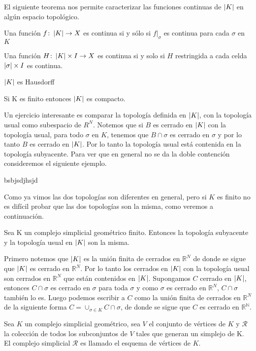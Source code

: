 El siguiente teorema nos permite caracterizar las funciones continuas de $\left| K \right|$ en algún espacio topológico.
\begin{Teo}\label{ttc}
Una función $f\colon \left| K \right|\rightarrow X$ es continua si y sólo si $f|_{\sigma}$ es continua para cada $\sigma$ en $K$
\end{Teo}
\begin{Teo}
Una función $H\colon \left| K \right|\times I \to X$ es continua si y solo si $H$ restringida a cada celda $\left| \sigma \right|\times I$ es continua.
\end{Teo}
\begin{Teo}
$\left| K \right|$ es Hausdorff
\end{Teo}
\begin{Teo}
Si K es finito entonces $\left| K \right|$ es compacto.
\end{Teo}
Un ejercicio interesante es comparar la topología definida en $\left| K \right|$, con la topología usual como subespacio de $R^{N}$. Notemos que si $B$ es cerrado en $\left| K \right|$ con la topología usual, para todo $\sigma$ en $K$, tenemos que $B\cap\sigma$ es cerrado en $\sigma$ y por lo tanto $B$ es cerrado en $\left| K \right|$. Por lo tanto la topología usual está contenida en la topología subyacente. Para ver que en general no se da la doble contención consideremos el siguiente ejemplo.
\begin{Ejem}
bsbjsdjhsjd
\end{Ejem}
Como ya vimos las dos topologías son diferentes en general, pero si $K$ es finito no es difícil probar que las dos topologías son la misma, como veremos a continuación.
\begin{Prop}
Sea K un complejo simplicial geométrico finito. Entonces la topología subyacente y la topología usual en $\left| K \right|$ son la misma.
\end{Prop}
\begin{Dem}

Primero notemos que $\left| K \right|$ es la unión finita de cerrados en $\mathbb{R}^N$ de donde se sigue que $\left| K \right|$ es cerrado en $\mathbb{R}^N$. Por lo tanto los cerrados en $\left| K \right|$ con la topología usual son cerrados en $\mathbb{R}^N$ que están contenidos en $\left| K \right|$.
Supongamos $C$ cerrado en $\left| K \right|$, entonces $C\cap\sigma$ es cerrado en $\sigma$ para toda $\sigma$ y como $\sigma$ es cerrado en $\mathbb{R}^N$, $C\cap\sigma$ también lo es. Luego podemos escribir a $C$ como la unión finita de cerrados en  $\mathbb{R}^N$ de la siguiente forma $C=\cup_{\sigma\in K}C\cap\sigma$, de donde se sigue que $C$ es cerrado en $\mathbb{R^N}$.
\end{Dem}
\begin{Defi}
Sea $K$ un complejo simplicial geométrico, sea $V$ el conjunto de vértices de $K$ y $\mathcal{R}$ la colección de todos los subconjuntos de $V$ tales que generan un simplejo de K. El complejo simplicial $\mathcal{R}$ es llamado el esquema de vértices de $K$.
\end{Defi}

